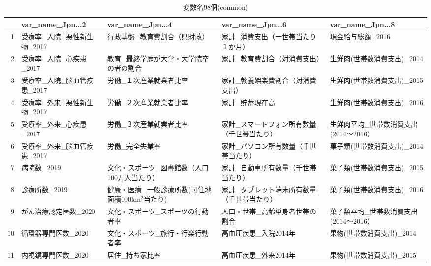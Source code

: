 \begin{table}[ht]
\centering
\caption{変数名98個(common)}
\label{table_commom_d.tex}
\begingroup\tiny

\begin{adjustbox}{width=.5\textwidth}

\begin{adjustbox}{width=.5\textwidth}

\begin{adjustbox}{width=.5\textwidth}
\begin{tabular}{rllll}
  \hline
 & var\_name\_Jpn...2 & var\_name\_Jpn...4 & var\_name\_Jpn...6 & var\_name\_Jpn...8 \\
  \hline
1 & 受療率\_入院\_悪性新生物\_2017 & 行政基盤\_教育費割合（県財政） & 家計\_消費支出（一世帯当たり１か月） & 現金給与総額\_2016 \\
  2 & 受療率\_入院\_心疾患\_2017 & 教育\_最終学歴が大学・大学院卒の者の割合 & 家計\_教育費割合（対消費支出） & 生鮮肉(世帯数消費支出)\_2014 \\
  3 & 受療率\_入院\_脳血管疾患\_2017 & 労働\_１次産業就業者比率 & 家計\_教養娯楽費割合（対消費支出） & 生鮮肉(世帯数消費支出)\_2015 \\
  4 & 受療率\_外来\_悪性新生物\_2017 & 労働\_２次産業就業者比率 & 家計\_貯蓄現在高 & 生鮮肉(世帯数消費支出)\_2016 \\
  5 & 受療率\_外来\_心疾患\_2017 & 労働\_３次産業就業者比率 & 家計\_スマートフォン所有数量（千世帯当たり） & 生鮮肉平均\_世帯数消費支出(2014〜2016） \\
  6 & 受療率\_外来\_脳血管疾患\_2017 & 労働\_完全失業率 & 家計\_パソコン所有数量（千世帯当たり） & 菓子類(世帯数消費支出)\_2014 \\
  7 & 病院数\_2019 & 文化・スポーツ\_図書館数（人口100万人当たり） & 家計\_自動車所有数量（千世帯当たり） & 菓子類(世帯数消費支出)\_2015 \\
  8 & 診療所数\_2019 & 健康・医療\_一般診療所数(可住地面積100km$^2$当たり) & 家計\_タブレット端末所有数量（千世帯当たり） & 菓子類(世帯数消費支出)\_2016 \\
  9 & がん治療認定医数\_2020 & 文化・スポーツ\_スポーツの行動者率 & 人口・世帯\_高齢単身者世帯の割合 & 菓子類平均\_世帯数消費支出(2014〜2016） \\
  10 & 循環器専門医数\_2020 & 文化・スポーツ\_旅行・行楽行動者率 & 高血圧疾患\_入院2014年 & 果物(世帯数消費支出)\_2014 \\
  11 & 内視鏡専門医数\_2020 & 居住\_持ち家比率 & 高血圧疾患\_外来2014年 & 果物(世帯数消費支出)\_2015 \\

\end{tabular}
\end{adjustbox}
\end{adjustbox}
\end{adjustbox}
\end{table}
